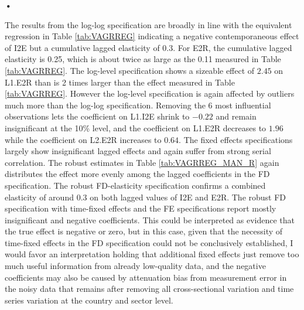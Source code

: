 \textbf{\textbf{•}}\documentclass[a4paper]{article}
\begin{document}


The results from the log-log specification are broadly in line with the equivalent regression in Table \ref{tab:VAGRREG} indicating a negative contemporaneous effect of I2E but a cumulative lagged elasticity of 0.3. For E2R, the cumulative lagged elasticity is 0.25, which is about twice as large as the 0.11 measured in Table \ref{tab:VAGRREG}. The log-level specification shows a sizeable effect of $2.45$ on L1.E2R than is 2 times larger than the effect measured in Table \ref{tab:VAGRREG}. However the log-level specification is again affected by outliers much more than the log-log specification. Removing the 6 most influential observations lets the coefficient on L1.I2E shrink to $-0.22$ and remain insignificant at the 10\% level, and the coefficient on L1.E2R decreases to $1.96$ while the coefficient on L2.E2R increases to $0.64$. The fixed effects specifications largely show insignificant lagged effects and again suffer from strong serial correlation. The robust estimates in Table \ref{tab:VAGRREG_MAN_R} again distributes the effect more evenly among the lagged coefficients in the FD specification. The robust FD-elasticity specification confirms a combined elasticity of around 0.3 on both lagged values of I2E and E2R. The robust FD specification with time-fixed effects and the FE specifications report mostly insignificant and negative coefficients. This could be interpreted as evidence that the true effect is negative or zero, but in this case, given that the necessity of time-fixed effects in the FD specification could not be conclusively established, I would favor an interpretation   holding that additional fixed effects just remove too much useful information from already low-quality data, and the negative coefficients may also be caused by attenuation bias from measurement error in the noisy data that remains after removing all cross-sectional variation and time series variation at the country and sector level.
\end{document}
